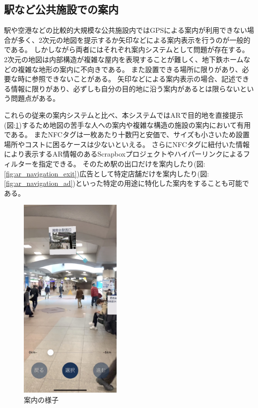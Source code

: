 \subsection{駅など公共施設での案内}
駅や空港などの比較的大規模な公共施設内ではGPSによる案内が利用できない場合が多く、2次元の地図を提示するか矢印などによる案内表示を行うのが一般的である。
しかしながら両者にはそれぞれ案内システムとして問題が存在する。
2次元の地図は内部構造が複雑な屋内を表現することが難しく、地下鉄ホームなどの複雑な地形の案内に不向きである。
また設置できる場所に限りがあり、必要な時に参照できないことがある。
矢印などによる案内表示の場合、記述できる情報に限りがあり、必ずしも自分の目的地に沿う案内があるとは限らないという問題点がある。

これらの従来の案内システムと比べ、本システムではARで目的地を直接提示(図:\ref{fig:ar_navigation_shonandai})するため地図の苦手な人への案内や複雑な構造の施設の案内において有用である。
またNFCタグは一枚あたり十数円と安価で、サイズも小さいため設置場所やコストに困るケースは少ないといえる。
さらにNFCタグに紐付いた情報により表示するAR情報のあるScrapboxプロジェクトやハイパーリンクによるフィルターを指定できる。
そのため駅の出口だけを案内したり(図:\ref{fig:ar_navigation_exit})広告として特定店舗だけを案内したり(図:\ref{fig:ar_navigation_ad})といった特定の用途に特化した案内をすることも可能である。

\begin{figure}[h]
  \centering
  \includegraphics[height=100mm]{images/ar_navigation_shonandai.jpg}
  \caption{案内の様子} \label{fig:ar_navigation_shonandai}
\end{figure}

